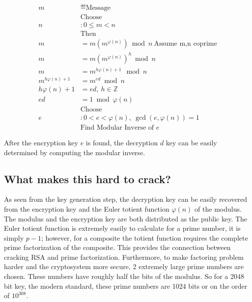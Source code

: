 \documentclass[journal]{IEEEtran}
\begin{document}
\begin{align*}
    m                    & \eqdef \text{Message}                                              \\
                         & \text{Choose}                                                      \\
    n                    & :0\leqslant m< n                                                   \\
                         & \text{Then}                                                        \\
    m                    & =m\left( m^{\varphi ( n)}\right)\bmod n\ \text{Assume m,n coprime} \\
    m                    & =m\left( m^{\varphi ( n)}\right)^{h}\bmod n                        \\
    m                    & =m^{h\varphi ( n) +1} \ \bmod n                                    \\
    m^{h\varphi ( n) +1} & =m^{ed}\bmod n                                                     \\
    h\varphi ( n) +1     & =ed,\ h\in \mathbb{Z}                                              \\
    ed                   & =1\bmod \varphi ( n)                                               \\
                         & \text{Choose}                                                      \\
    e                    & :0< e< \varphi ( n) ,\ \gcd\left( e,\varphi ( n)\right) =1\        \\
                         & \text{Find Modular Inverse of } e
\end{align*}

After the encryption key \(e\) is found, the decryption \(d\) key can be easily
determined by computing the modular inverse.

\subsection{What makes this hard to crack?}

As seen from the key generation step, the decryption key can be easily recovered
from the encryption key and the Euler totient function \(\varphi(n)\) of the modulus. The
modulus and the encryption key are both distributed as the public key. The
Euler totient function is extremely easily to calculate for a prime number, it
is simply \(p-1\); however, for a composite the totient function requires the
complete prime factorization of the composite. This provides the connection
between cracking RSA and prime factorization.   Furthermore, to make factoring
problem harder and the cryptosystem more secure, 2 extremely large prime numbers
are chosen. These numbers have roughly half the bits of the modulus. So for a
2048 bit key, the modern standard, these prime numbers are 1024 bits or on the order of \(10^{308}\).
\end{document}
